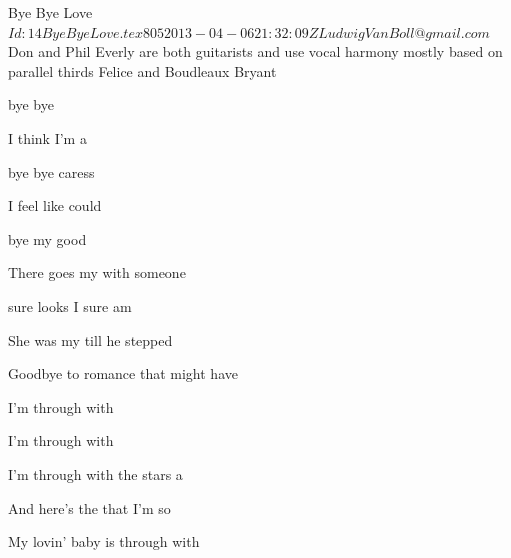 \begin{SBSong}{Bye Bye Love}
  {$Id: 14ByeByeLove.tex 805 2013-04-06 21:32:09Z LudwigVanBoll@gmail.com $}
  {Don and Phil Everly are both guitarists and use vocal harmony mostly based on parallel thirds}
  {Felice and Boudleaux Bryant}
  \begin{SBChorus}
     bye   bye   
	
      I think I'm a   
	
     bye   bye  caress 
	
      I feel like  could 
	
     bye my  good 
  \end{SBChorus}
  \begin{SBVerse}
    There goes my  with someone 
	
     sure looks  I sure am  
	
    She was my  till he stepped   
	
    Goodbye to romance that might have   
  \end{SBVerse}
  \begin{SBVerse}
    I'm through with 
    
    I'm through with  
	
    I'm through with  the stars a   
	
    And here's the  that I'm so 
	
    My lovin' baby is through with   
  \end{SBVerse}
\end{SBSong}